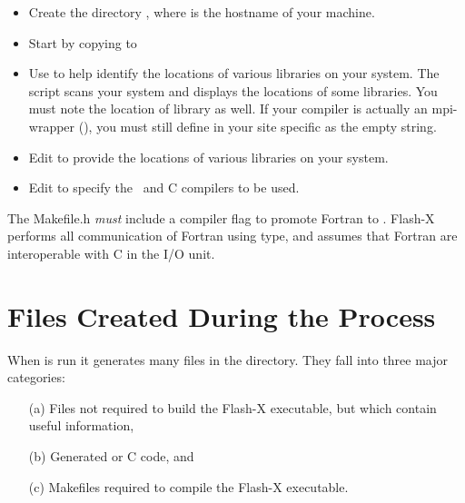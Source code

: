 \begin{itemize}
\item Create the directory , where 
is the hostname of your machine.

\item Start by copying  to 

\item Use  to help identify the
locations of various libraries on your system. The script scans your
system and displays the locations of some libraries. You must note
the location of  library as well. If your compiler is actually
an mpi-wrapper (\eg {}), you must still define  in your
site specific  as the empty string.

\item Edit  to provide the locations of
various libraries on your system.

\item Edit  to specify the \FORTRAN\
and C compilers to be used.
\end{itemize}


\begin{flashtip}
The Makefile.h \emph{must} include a compiler flag to promote Fortran
 to \code{Double Precision}.  Flash-X performs all
 communication of Fortran  using
 type, and assumes that Fortran
\code{Reals} are interoperable with C  in the I/O unit.
\end{flashtip}



\section{Files Created During the  Process}

When \setup is run it generates many files in the 
directory. They fall into three major categories:

\begin{itemize}
\item[(a)] Files not required to build the Flash-X executable, but
which contain useful information,
\item[(b)] Generated  or C code, and
\item[(c)] Makefiles required to compile the Flash-X executable.
\end{itemize}

